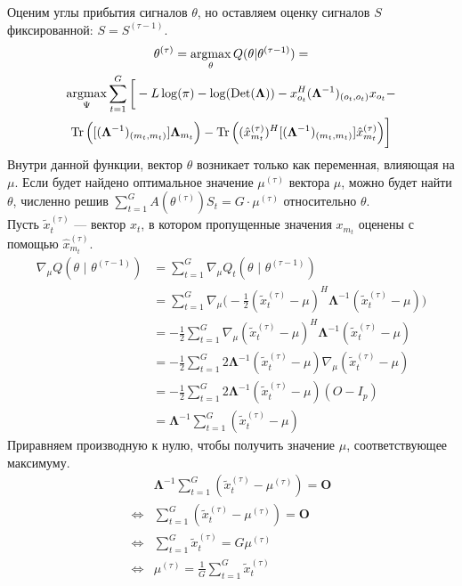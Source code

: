 \documentclass[11pt]{article}
\DeclareMathOperator*{\argmax}{argmax}
\DeclareMathOperator{\Det}{Det}
\begin{document}
Оценим углы прибытия сигналов $\theta$, но оставляем оценку сигналов $S$ фиксированной: $S = S^{(\tau-1)}$.
\begin{equation*}
\begin{gathered}
\theta^{(\tau)}= \argmax_{\theta} Q(\theta | \theta^{(\tau-1)}) = \\
\argmax_{\Psi}  \sum_{t=1}^G \bigg[ -L \log(\pi) - \log (\Det(\mathbf{\Lambda})) - x_{o_t}^H (\mathbf{\Lambda}^{-1})_{(o_t, o_t)}x_{o_t} -  \\ \Tr \Big( [(\mathbf{\Lambda}^{-1})_{(m_t, m_t)}]\mathbf{\Lambda}_{m_t} \Big) - \Tr \Big((\hat{x}_{m_t}^{(\tau)})^H[(\mathbf{\Lambda}^{-1})_{(m_t, m_t)}]\hat{x}_{m_t}^{(\tau)} \Big)  \bigg]
\end{gathered}
\end{equation*}
Внутри данной функции, вектор $\theta$ возникает только как переменная, влияющая на $\mu$. Если будет найдено оптимальное значение $\mu^{(\tau)}$ вектора $\mu$, можно будет найти $\theta$, 
численно решив $\sum_{t=1}^G A(\theta^{(\tau)})S_t = G \cdot \mu^{(\tau)}$ относительно $\theta$. \\
Пусть $\widetilde{x}_t^{(\tau)}$ --- вектор $x_t$, в котором пропущенные значения $x_{m_t}$ оценены с помощью $\hat{x}_{m_t}^{(\tau)}$.
\begin{align*}
\nabla_{\mu} Q(\theta \text{ | } \theta^{(\tau-1)}) &= \sum_{t = 1}^{G} \nabla_{\mu} Q_t (\theta \text{ | } \theta^{(\tau-1)}) \\
&= \sum_{t = 1}^{G} \nabla_{\mu} \Big( -\frac{1}{2} (\widetilde{x}_t^{(\tau)} - \mu)^H \mathbf{\Lambda}^{-1} (\widetilde{x}_t^{(\tau)} - \mu) \Big) \\
&= -\frac{1}{2} \sum_{t = 1}^{G} \nabla_{\mu} (\widetilde{x}_t^{(\tau)} - \mu)^H \mathbf{\Lambda}^{-1} (\widetilde{x}_t^{(\tau)} - \mu) \\
&= -\frac{1}{2} \sum_{t = 1}^{G} 2 \mathbf{\Lambda}^{-1} (\widetilde{x}_t^{(\tau)} - \mu) \nabla_{\mu} (\widetilde{x}_t^{(\tau)} - \mu) \\
&= -\frac{1}{2} \sum_{t = 1}^{G} 2 \mathbf{\Lambda}^{-1} (\widetilde{x}_t^{(\tau)} - \mu) (O - I_p) \\
&= \mathbf{\Lambda}^{-1} \sum_{t = 1}^{G} (\widetilde{x}_t^{(\tau)} - \mu)
\end{align*}
Приравняем производную к нулю, чтобы получить значение $\mu$, соответствующее максимуму.
\begin{align*}
&\mathbf{\Lambda}^{-1} \sum_{t = 1}^{G} (\widetilde{x}_t^{(\tau)} - \mu^{(\tau)}) = \mathbf{O} \\
\iff& \sum_{t = 1}^{G} (\widetilde{x}_t^{(\tau)} - \mu^{(\tau)}) = \mathbf{O} \\
\iff& \sum_{t = 1}^{G} \widetilde{x}_t^{(\tau)} = G \mu^{(\tau)} \\
\iff& \mu^{(\tau)} = \frac{1}{G} \sum_{t = 1}^{G} \widetilde{x}_t^{(\tau)}
\end{align*}
\end{document}
